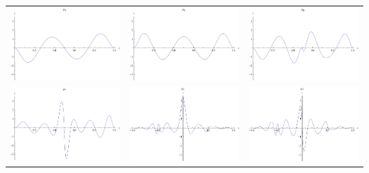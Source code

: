 \documentclass{article}
\begin{document}
\begin{landscape}
\begin{tabular}{ccc}
\includegraphics[width=6.7cm]{octic_bspline_4.pdf}& \includegraphics[width=6.7cm]{octic_bspline_5.pdf}& \includegraphics[width=6.7cm]{octic_bspline_6.pdf} \\
\includegraphics[width=6.7cm]{octic_bspline_7.pdf}& \includegraphics[width=6.7cm]{octic_bspline_8.pdf}& \includegraphics[width=6.7cm]{octic_bspline_9.pdf} \\
\end{tabular} 
 \end{landscape}
\end{document}
